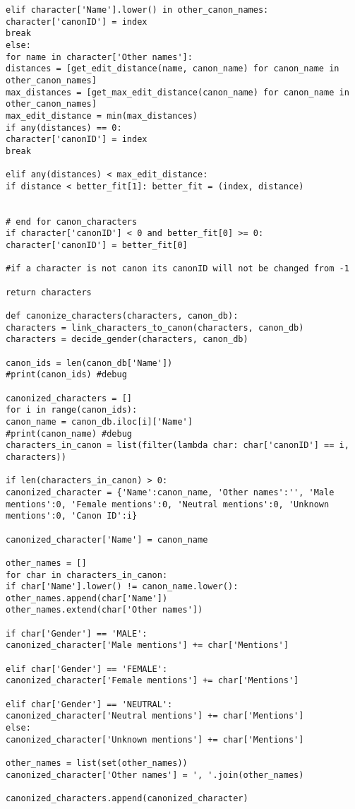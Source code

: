 \documentclass{pre-tfg}
\begin{document}
\begin{lstlisting}[style=consola]
elif character['Name'].lower() in other_canon_names:
character['canonID'] = index
break
else:
for name in character['Other names']:
distances = [get_edit_distance(name, canon_name) for canon_name in other_canon_names]
max_distances = [get_max_edit_distance(canon_name) for canon_name in other_canon_names]
max_edit_distance = min(max_distances)
if any(distances) == 0:
character['canonID'] = index
break

elif any(distances) < max_edit_distance:
if distance < better_fit[1]: better_fit = (index, distance)


# end for canon_characters			
if character['canonID'] < 0 and better_fit[0] >= 0:
character['canonID'] = better_fit[0]

#if a character is not canon its canonID will not be changed from -1

return characters

def canonize_characters(characters, canon_db):
characters = link_characters_to_canon(characters, canon_db)
characters = decide_gender(characters, canon_db)

canon_ids = len(canon_db['Name'])
#print(canon_ids) #debug

canonized_characters = []
for i in range(canon_ids):
canon_name = canon_db.iloc[i]['Name']
#print(canon_name) #debug
characters_in_canon = list(filter(lambda char: char['canonID'] == i, characters))

if len(characters_in_canon) > 0:
canonized_character = {'Name':canon_name, 'Other names':'', 'Male mentions':0, 'Female mentions':0, 'Neutral mentions':0, 'Unknown mentions':0, 'Canon ID':i}

canonized_character['Name'] = canon_name

other_names = []
for char in characters_in_canon:
if char['Name'].lower() != canon_name.lower(): other_names.append(char['Name'])
other_names.extend(char['Other names'])

if char['Gender'] == 'MALE':
canonized_character['Male mentions'] += char['Mentions']

elif char['Gender'] == 'FEMALE':
canonized_character['Female mentions'] += char['Mentions']

elif char['Gender'] == 'NEUTRAL':
canonized_character['Neutral mentions'] += char['Mentions']
else:
canonized_character['Unknown mentions'] += char['Mentions']

other_names = list(set(other_names))
canonized_character['Other names'] = ', '.join(other_names)

canonized_characters.append(canonized_character)


\end{lstlisting}
\end{document}
